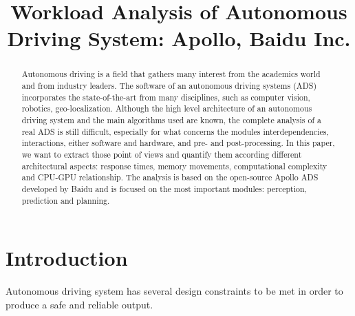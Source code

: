 \documentclass[conference]{IEEEtran}
\begin{document}

\title{Workload Analysis of Autonomous Driving System: Apollo, Baidu Inc.}

\author{
\and
{}
\and
{}
}
\maketitle

\begin{abstract}
    Autonomous driving is a field that gathers many interest from the academics world and from industry leaders.
    The software of an autonomous driving systems (ADS) incorporates the state-of-the-art from many disciplines, such as computer vision, robotics, geo-localization.
    Although the high level architecture of an autonomous driving system and the main algorithms used are known, the complete analysis of a real ADS is still difficult, especially for what concerns the modules interdependencies, interactions, either software and hardware, and pre- and post-processing.
    In this paper, we want to extract those point of views and quantify them according different architectural aspects: response times, memory movements, computational complexity and CPU-GPU relationship.
    The analysis is based on the open-source Apollo ADS developed by Baidu and is focused on the most important modules: perception, prediction and planning.
\end{abstract}

\section{Introduction}
Autonomous driving system has several design constraints \cite{b1} to be met in order to produce a safe and reliable output.
\end{document}
